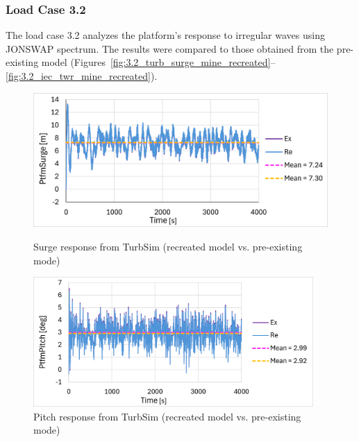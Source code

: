 \documentclass[a4paper, 11pt]{article}
\begin{document}
\subsubsection{Load Case 3.2}
\hspace*{0.5cm}The load case 3.2 analyzes the platform's response to irregular waves using JONSWAP spectrum. The results were compared to those obtained from the pre-existing model (Figures~\ref{fig:3.2_turb_surge_mine_recreated}--\ref{fig:3.2_iec_twr_mine_recreated}).

\begin{figure}[H]
    \begin{minipage}{0.48\textwidth}
        \centering
        \includegraphics[width=1\textwidth]{3.2_turb_surge_mine.png}
        \caption{\small Surge response from TurbSim (recreated model vs. pre-existing mode)}
        \label{fig:3.2_turb_surge_mine_recreated}
    \end{minipage}
    \hfill
    \begin{minipage}{0.5\textwidth}
        \centering
        \includegraphics[width=0.95\textwidth]{3.2_turb_pitch_mine.png}
        \caption{\small Pitch response from TurbSim (recreated model vs. pre-existing mode)}
        \label{fig:3.2_turb_pitch_mine_recreated}
    \end{minipage}
\end{figure}
\end{document}
